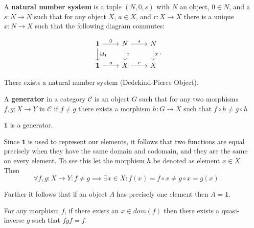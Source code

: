 \begin{definition}
A \textbf{natural number system} is a tuple $(N,0,s)$ with $N$ an object, $0 \in N$, and a $s: N \longrightarrow N$ such that for any object $X$, $a \in X$, and $r: X \longrightarrow X$
there is a unique $x: N \longrightarrow X$ such that the following diagram commutes:

\begin{equation*}
\begin{tikzcd}
\mathbf{1} \arrow[r, "0"] \arrow[d, "id_\mathbf{1}"]
& N \arrow[r, "s"] \arrow[d, "x", dotted]
& N \arrow[d, "x", dotted]   \\
\mathbf{1} \arrow[r, "a"]
& X \arrow[r, "r"]
& X
\end{tikzcd}.
\end{equation*}

\end{definition}

\begin{axiom}
There exists a natural number system (Dedekind-Pierce Object).
\end{axiom}

\begin{definition}
A \textbf{generator} in a category $\mathcal{C}$ is an object $G$ such that for any two morphisms $f,g: X \longrightarrow Y$ in $\mathcal{C}$ if $f \neq g$ there exists a morphism $h: G \longrightarrow X$ such that $f \circ h \neq g \circ h$
\end{definition}

\begin{axiom}
$\mathbf{1}$ is a generator.
\end{axiom}

\begin{remark}
Since $\mathbf{1}$ is used to represent our elements, it follows that two functions are equal precisely when they have the same domain and codomain, and they are the same on every element. To see this let the morphism $h$ be denoted as element $x \in X$. Then
\begin{equation*}
\forall f,g: X \longrightarrow Y: f \neq g \implies \exists x \in X : f(x) = f \circ x \neq g \circ x = g(x).
\end{equation*}

Further it follows that if an object $A$ has precisely one element then $A = \mathbf{1}$. 
\end{remark}

\begin{axiom}[AC]
For any morphism $f$, if there exists an $x \in dom(f)$ then there exists a quasi-inverse $g$ such that $fgf = f$.
\end{axiom}

